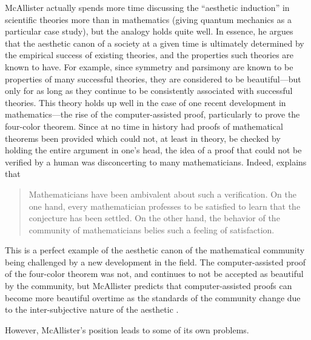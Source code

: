 \documentclass[a4paper,man,natbib]{apa6}
\begin{document}
McAllister actually spends more time discussing the ``aesthetic induction'' in scientific theories more than
in mathematics (giving quantum mechanics as a particular case study), but the analogy holds quite well. In 
essence, he argues that the aesthetic canon of a society
at a given time is ultimately determined by the empirical success of existing theories, and the properties such
theories are known to have. For example, since symmetry and parsimony are known to be properties of many 
successful theories, they are considered to be beautiful---but only for as long as they continue to be consistently 
associated with successful theories. This theory holds up well in the case of one recent development in 
mathematics---the rise of the computer-assisted proof, particularly to prove the four-color theorem. Since at no
time in history had proofs of mathematical theorems been provided which could not, at least in theory, be checked 
by holding the entire argument in one's head, the idea of a proof that could not be verified by a human was
disconcerting to many mathematicians. Indeed, \cite{rota_phenomenology_1997} explains that
\begin{quotation}
      Mathematicians have been ambivalent about such a verification. On the one hand, every mathematician 
      professes to be satisfied to learn that the conjecture has been settled. On the other hand, the 
      behavior of the community of mathematicians belies such a feeling of satisfaction.
\end{quotation}
This is a perfect example of the aesthetic canon of the mathematical community being challenged by a new
development in the field. The computer-assisted proof of the four-color theorem was not, and continues to not be 
accepted as beautiful by the community, but McAllister predicts that computer-assisted proofs can become more 
beautiful overtime as the standards of the community change due to the inter-subjective nature of the 
aesthetic \cite{mcallister_mathematical_2005}.

However, McAllister's position leads to some of its own problems.
\end{document}
